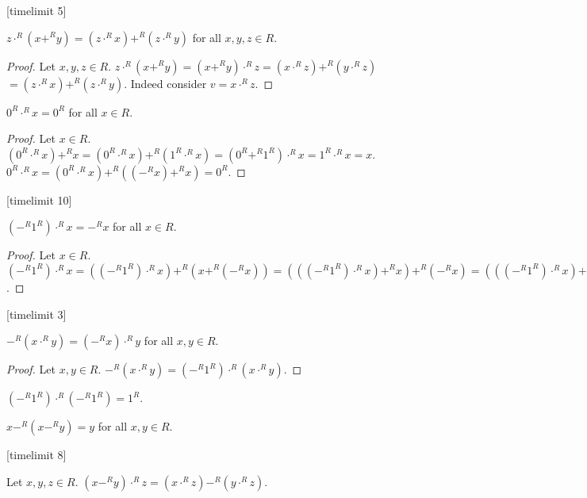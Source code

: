 \documentclass[11pt]{article}
\begin{document}
\begin{forthel}

[timelimit 5]
\begin{lemma} 
$z \cdot^{R} (x +^{R} y) = (z \cdot^{R} x) +^{R} (z \cdot^{R} y)$ 
for all $x,y,z \in R$.
\end{lemma}
\begin{proof}
Let $x,y,z \in R$.
$z \cdot^{R} (x +^{R} y) = 
(x +^{R} y) \cdot^{R} z = (x \cdot^{R} z) +^{R} (y \cdot^{R} z)$
$= (z \cdot^{R} x) +^{R} (z \cdot^{R} y)$. 
Indeed consider $v = x \cdot^{R} z$.
\end{proof}

\begin{lemma} $ 0^{R} \cdot^{R} x = 0^{R}$ for all $x \in R$. \end{lemma}
\begin{proof} Let $x \in R$.
$ (0^{R} \cdot^{R} x) +^{R} x = (0^{R} \cdot^{R} x) +^{R} (1^{R} \cdot^{R} x) 
= (0^{R} +^{R} 1^{R}) \cdot^{R} x =  1^{R} \cdot^{R} x = x $.
$ 0^{R} \cdot^{R} x = (0^{R} \cdot^{R} x) +^{R} ((-^{R}x) +^{R} x) = 0^{R}$.
\end{proof}
[timelimit 10]
\begin{lemma}
$ (-^{R} 1^{R}) \cdot^{R} x = -^{R} x$ for all $x \in R$. 
\end{lemma}
\begin{proof}
Let $x \in R$.
$ (-^{R} 1^{R}) \cdot^{R} x = 
((-^{R} 1^{R}) \cdot^{R} x) +^{R} (x +^{R} (-^{R} x)) =
(((-^{R} 1^{R}) \cdot^{R} x) +^{R} x) +^{R} (-^{R} x) =
(((-^{R} 1^{R}) \cdot^{R} x) +^{R} (1^{R} \cdot^{R} x)) +^{R} (-^{R} x)$.
\end{proof}
[timelimit 3]

\begin{lemma}
$-^{R}( x \cdot^{R} y) = (-^{R}  x) \cdot^{R} y$ for all $x,y \in R$.
\end{lemma}
\begin{proof} Let $x,y \in R$.
$-^{R}( x \cdot^{R} y) = (-^{R}1^{R}) \cdot^{R} ( x \cdot^{R} y)$.
\end{proof}

\begin{lemma}
$ (-^{R} 1^{R}) \cdot^{R} (-^{R} 1^{R}) = 1^{R}$.
\end{lemma}

\begin{lemma}
$x -^{R} (x -^{R} y) = y$ for all $x,y \in R$.
\end{lemma}

[timelimit 8]
\begin{lemma}  Let $x,y,z \in R$.
$(x -^{R} y) \cdot^{R} z = (x \cdot^{R} z) -^{R} (y \cdot^{R} z)$.
\end{lemma}


\end{forthel}
\end{document}
